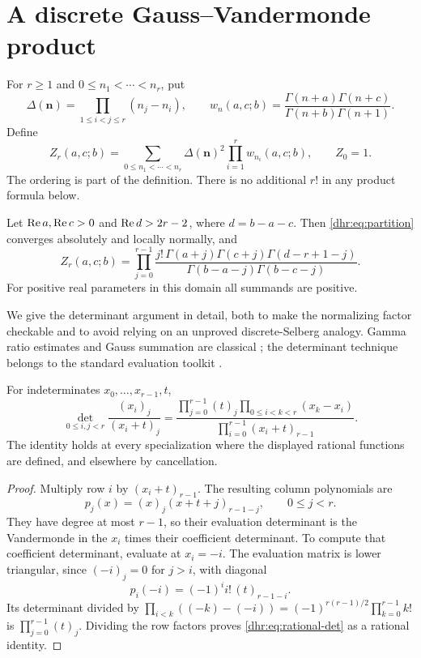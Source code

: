 \section{A discrete Gauss--Vandermonde product}
\label{dhr:sec:determinant}

For $r\geq1$ and $0\leq n_1<\cdots<n_r$, put
\[
 \Delta(\bm n)=\prod_{1\leq i<j\leq r}(n_j-n_i),\qquad
 w_n(a,c;b)=\frac{\Gamma(n+a)\Gamma(n+c)}
 {\Gamma(n+b)\Gamma(n+1)}.
\]
Define
\begin{equation}\label{dhr:eq:partition}
 Z_r(a,c;b)=\sum_{0\leq n_1<\cdots<n_r}
       \Delta(\bm n)^2\prod_{i=1}^r w_{n_i}(a,c;b),
 \qquad Z_0=1.
\end{equation}
The ordering is part of the definition. There is no additional $r!$
in any product formula below.

\begin{theorem}\label{dhr:thm:gauss}
Let $\operatorname{Re} a,\operatorname{Re} c>0$ and $\operatorname{Re} d>2r-2$, where $d=b-a-c$.
Then \eqref{dhr:eq:partition} converges absolutely and locally normally,
and
\begin{equation}\label{dhr:eq:gauss-product}
 \boxed{\displaystyle
 Z_r(a,c;b)=\prod_{j=0}^{r-1}
 \frac{j!\,\Gamma(a+j)\Gamma(c+j)\Gamma(d-r+1-j)}
 {\Gamma(b-a-j)\Gamma(b-c-j)}.}
\end{equation}
For positive real parameters in this domain all summands are positive.
\end{theorem}

We give the determinant argument in detail, both to make the normalizing
factor checkable and to avoid relying on an unproved discrete-Selberg
analogy. Gamma ratio estimates and Gauss summation are classical
\cite{dlmf:gamma,dlmf:gauss}; the determinant technique belongs to the
standard evaluation toolkit \cite{krattenthaler}.

\begin{lemma}\label{dhr:lem:rational-det}
For indeterminates $x_0,\ldots,x_{r-1},t$,
\begin{equation}\label{dhr:eq:rational-det}
 \det_{0\leq i,j<r}\frac{(x_i)_j}{(x_i+t)_j}
 =\frac{\displaystyle\prod_{j=0}^{r-1}(t)_j
                   \prod_{0\leq i<k<r}(x_k-x_i)}
        {\displaystyle\prod_{i=0}^{r-1}(x_i+t)_{r-1}}.
\end{equation}
The identity holds at every specialization where the displayed
rational functions are defined, and elsewhere by cancellation.
\end{lemma}
\begin{proof}
Multiply row $i$ by $(x_i+t)_{r-1}$. The resulting column polynomials
are
\[
 p_j(x)=(x)_j(x+t+j)_{r-1-j},\qquad 0\leq j<r.
\]
They have degree at most $r-1$, so their evaluation determinant is
the Vandermonde in the $x_i$ times their coefficient determinant.
To compute that coefficient determinant, evaluate at $x_i=-i$.
The evaluation matrix is lower triangular, since $(-i)_j=0$ for
$j>i$, with diagonal
\[
 p_i(-i)=(-1)^i i!\,(t)_{r-1-i}.
\]
Its determinant divided by
$\prod_{i<k}((-k)-(-i))=(-1)^{r(r-1)/2}\prod_{k=0}^{r-1}k!$
is $\prod_{j=0}^{r-1}(t)_j$. Dividing the row factors proves
\eqref{dhr:eq:rational-det} as a rational identity.
\end{proof}

